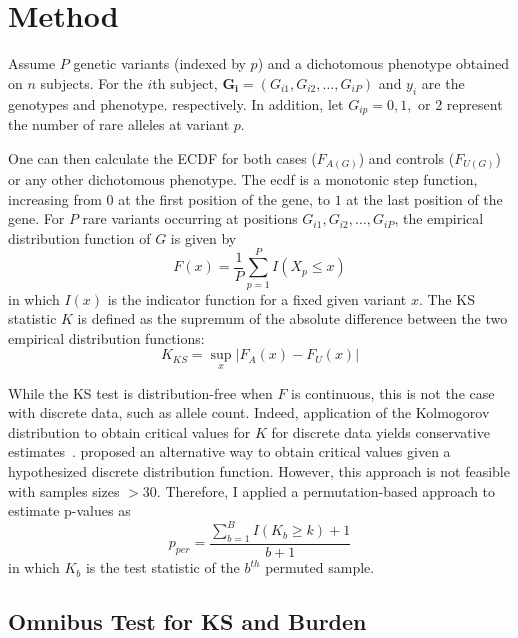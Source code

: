 \section{Method}
\label{sec:method_ksburden}

Assume $P$ genetic variants (indexed by $p$) and a dichotomous phenotype obtained on $n$ subjects.
For the $i$th subject,   $\bm{G_i} = (G_{i1}, G_{i2},\ldots , G_{iP})$ and $y_i$ are the genotypes and phenotype. respectively.
In addition, let $G_{ip} = 0, 1,$ or $2$ represent the number of rare alleles at variant $p$.  

One can then calculate the \acrfull{ECDF} for both cases ($F_{A(G)}$) and controls ($F_{U(G)}$) or any other dichotomous phenotype.
The ecdf is a monotonic step function, increasing from $0$ at the first position of the gene, to $1$ at the last position of the gene.
For $P$ rare variants occurring at positions  $G_{i1}, G_{i2}, \ldots, G_{iP}$, the empirical distribution function of $G$ is given by
\begin{equation}
  F(x) = \frac{1}{P}\sum^P_{p=1}I(X_p \leq x)
\end{equation}
in which $I(x)$ is the indicator function for a fixed given variant $x$.
The KS statistic $K$ is defined as the supremum of the absolute difference between the two empirical distribution functions:
\begin{equation}
	K_{KS} = \sup_x | F_A(x) - F_U(x) |
\end{equation}

While the KS test is distribution-free when $F$ is continuous, this is not the case with discrete data, such as allele count.
Indeed, application of the Kolmogorov distribution to obtain critical values for $K$ for discrete data yields conservative estimates~\cite{Walsh1963,Conover1972}. 
\citet{Conover1972} proposed an alternative way to obtain critical values given a hypothesized discrete distribution function.
However, this approach is not feasible with samples sizes $>30$.
Therefore, I applied a permutation-based approach to estimate p-values as 
\begin{equation}
  p_{per} = \frac{\sum^B_{b=1} I(K_b \geq k)+1}{b+1}
\end{equation}
in which $K_b$ is the test statistic of the $b^{th}$ permuted sample.

\subsection{Omnibus Test for KS and Burden}
\label{sub:omnibus_test_for_ks_and_burden}

